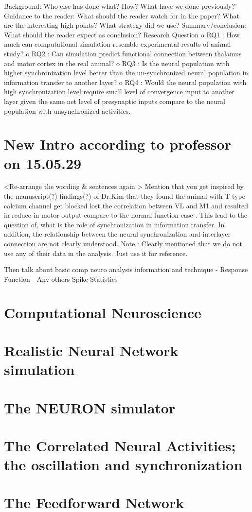 Background: Who else has done what? How? What have we done previously?’
Guidance to the reader: What should the reader watch for in the paper? What are the interesting high points? What strategy did we use?
Summary/conclusion: What should the reader expect as conclusion?
Research Question
o RQ1 : How much can computational simulation resemble experimental results of animal study?
o RQ2 : Can simulation predict functional connection between thalamus and motor cortex in the real animal?
o	RQ3 : Is the neural population with higher synchronization level better than the un-synchronized neural population in information transfer to another layer? 
o	RQ4 : Would the  neural population with high synchronization level  require small level of convergence input to another layer given the same net level of presynaptic inputs compare to the neural population with unsynchronized activities.

\section{New Intro according to professor on 15.05.29}
<Re-arrange the wording \& sentences again >
Mention that you get inspired by the manuscript(?) findings(?) of Dr.Kim that they found the animal with T-type calcium channel get blocked lost the correlation between VL and M1 and resulted in reduce in motor output
compare to the normal function case . This lead to the question of, what is the role of synchronization in information transfer.  In addition, the relationship between the neural synchronization and interlayer connection are not clearly understood. 
Note : Clearly mentioned that we do not use any of their data in the analysis. Just use it for reference. 

Then talk about basic comp neuro analysis information and technique 
- Response Function
- Any others  Spike Statistics 
\section{Computational Neuroscience}
\section{Realistic Neural Network simulation}

\section{The NEURON simulator}
\section{The Correlated Neural Activities; the oscillation and synchronization}
\section{The Feedforward Network}